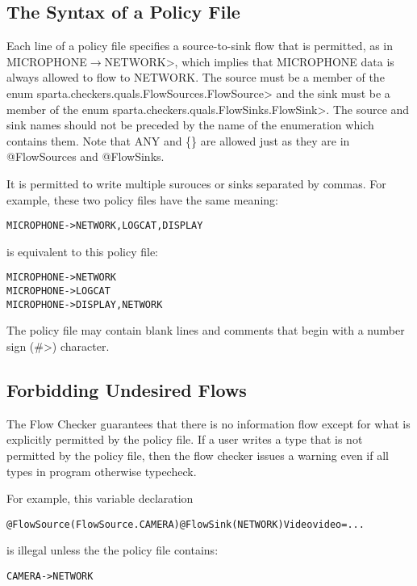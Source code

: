 \subsection{The Syntax of a Policy File}

Each line of a policy file specifies a source-to-sink flow that is permitted, as in
\<MICROPHONE$\rightarrow$NETWORK>, which implies that
MICROPHONE data is always allowed to flow to NETWORK.  
The source must be a member of the enum
\<sparta.checkers.quals.FlowSources.FlowSource> and the sink must be a
member of the enum 
\<sparta.checkers.quals.FlowSinks.FlowSink>.  The source 
and sink names should not be preceded by the name of the enumeration which contains them.
Note that ANY and \{\} are allowed just as they are in @FlowSources and @FlowSinks.

It is permitted to write multiple surouces or sinks separated by commas. For example,
these two policy files have the same meaning:

\begin{alltt}
   MICROPHONE -> NETWORK, LOGCAT, DISPLAY
\end{alltt}
is equivalent to this policy file:
\begin{alltt}
   MICROPHONE -> NETWORK
   MICROPHONE -> LOGCAT
   MICROPHONE -> DISPLAY, NETWORK
\end{alltt}

The policy file may contain blank lines and comments that begin with 
a number sign (\<\#>) character.


\subsection{Forbidding Undesired Flows}
\label{sec:undsiredflows}
The Flow Checker guarantees that there is no information
flow except for what is explicitly permitted by the policy file. If a user writes a type that is
not permitted by the policy file, then the flow checker issues a warning
even if all types in program otherwise typecheck.

For example, this variable declaration

\begin{alltt}
@FlowSource(FlowSource.CAMERA) @FlowSink(NETWORK) Video video = ...
\end{alltt}

\noindent
is illegal unless the the policy file contains:

\begin{alltt}
CAMERA -> NETWORK
\end{alltt}

